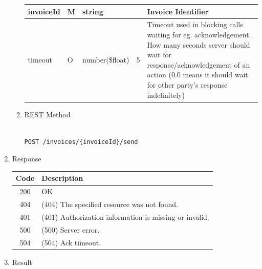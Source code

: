\begin{enumerate}
\begin{enumerate}
\begin{table}[H]
\begin{center}
\begin{tabular}{|p{3cm}|l|p{3cm}|p{3cm}|p{4cm}|}
invoiceId				& M	&	string				&								&	Invoice Identifier \\
\hline   

timeout					& O &	number(\$float)		&	5							&	Timeout used in blocking calls waiting for eg. acknowledgement. 
																						How many seconds server should wait for response/acknowledgement 
																						of an action 
																						(0.0 means it should wait for other party's response indefinitely) \\
\hline

\end{tabular}
\end{center}
\end{table}


\item REST Method

\begin{tcolorbox}[boxrule=0pt, frame empty]
\begin{verbatim} 

POST /invoices/{invoiceId}/send

\end{verbatim}
\end{tcolorbox}

\end{enumerate}

\item Response

\begin{table}[H]
\footnotesize

\begin{center}
\begin{tabular}{|c|l|} 
\hline
\rowcolor{lightgray}	Code 		& 	Description \\
\hline
200	 		&	OK \\
\hline
404			&	(404) The specified resource was not found. \\
\hline
401			&	(401) Authorization information is missing or invalid. \\
\hline
500			&	(500) Server error. \\
\hline
504			&	(504) Ack timeout. \\
\hline

\end{tabular}
\end{center}

\end{table}

\item Result


\end{enumerate}
